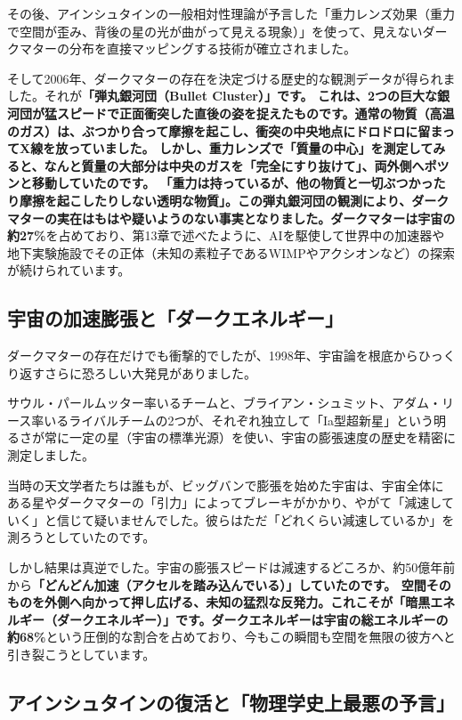 その後、アインシュタインの一般相対性理論が予言した「重力レンズ効果（重力で空間が歪み、背後の星の光が曲がって見える現象）」を使って、見えないダークマターの分布を直接マッピングする技術が確立されました。

そして2006年、ダークマターの存在を決定づける歴史的な観測データが得られました。それが\textbf{「弾丸銀河団（Bullet Cluster）」です。 これは、2つの巨大な銀河団が猛スピードで正面衝突した直後の姿を捉えたものです。通常の物質（高温のガス）は、ぶつかり合って摩擦を起こし、衝突の中央地点にドロドロに留まってX線を放っていました。 しかし、重力レンズで「質量の中心」を測定してみると、なんと質量の大部分は中央のガスを「完全にすり抜けて」、両外側へポツンと移動していたのです。 「重力は持っているが、他の物質と一切ぶつかったり摩擦を起こしたりしない透明な物質」。この弾丸銀河団の観測により、ダークマターの実在はもはや疑いようのない事実となりました。ダークマターは宇宙の約27\%}を占めており、第13章で述べたように、AIを駆使して世界中の加速器や地下実験施設でその正体（未知の素粒子であるWIMPやアクシオンなど）の探索が続けられています。

\subsection{宇宙の加速膨張と「ダークエネルギー」}

ダークマターの存在だけでも衝撃的でしたが、1998年、宇宙論を根底からひっくり返すさらに恐ろしい大発見がありました。

サウル・パールムッター率いるチームと、ブライアン・シュミット、アダム・リース率いるライバルチームの2つが、それぞれ独立して「Ia型超新星」という明るさが常に一定の星（宇宙の標準光源）を使い、宇宙の膨張速度の歴史を精密に測定しました。

当時の天文学者たちは誰もが、ビッグバンで膨張を始めた宇宙は、宇宙全体にある星やダークマターの「引力」によってブレーキがかかり、やがて「減速していく」と信じて疑いませんでした。彼らはただ「どれくらい減速しているか」を測ろうとしていたのです。

しかし結果は真逆でした。宇宙の膨張スピードは減速するどころか、約50億年前から\textbf{「どんどん加速（アクセルを踏み込んでいる）」していたのです。 空間そのものを外側へ向かって押し広げる、未知の猛烈な反発力。これこそが「暗黒エネルギー（ダークエネルギー）」です。ダークエネルギーは宇宙の総エネルギーの約68\%}という圧倒的な割合を占めており、今もこの瞬間も空間を無限の彼方へと引き裂こうとしています。

\subsection{アインシュタインの復活と「物理学史上最悪の予言」}


